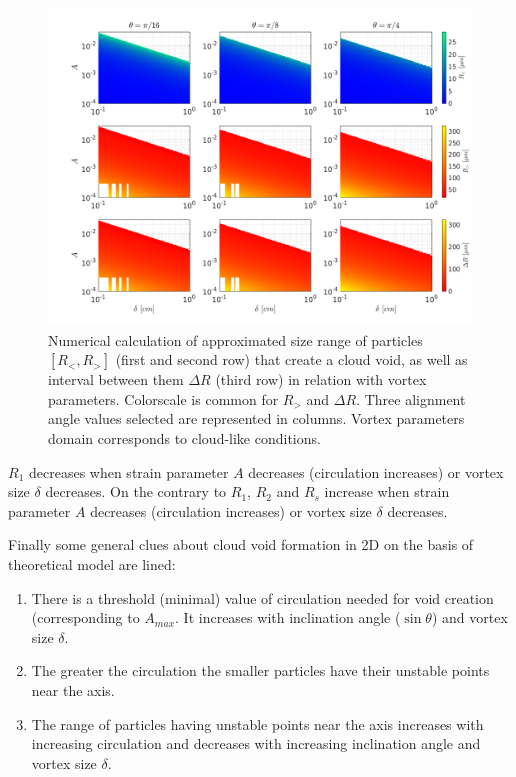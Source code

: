 \documentclass[../main.tex]{subfiles}
\begin{document}
\begin{figure}[h]
\centering
\noindent\includegraphics[width=35pc]{gfx/RlRrDeltaR.png}
\caption{Numerical calculation of approximated size range of particles $[R_<,R_>]$ (first and second row) that create a cloud void, as well as interval between them $\Delta R$ (third row) in relation with vortex parameters. Colorscale is common for $R_>$ and $\Delta R$. Three alignment angle values selected are represented in columns. Vortex parameters domain corresponds to cloud-like conditions.}
\label{fig:ch4_6}
\end{figure}

$R_1$ decreases when strain parameter $A$ decreases (circulation increases) or vortex size $\delta$ decreases. On the contrary to $R_1$, $R_2$ and $R_s$ increase when strain parameter $A$ decreases (circulation increases) or vortex size $\delta$ decreases.

Finally some general clues about cloud void formation in 2D on the basis of theoretical model are lined:
\begin{enumerate}
\item There is a threshold (minimal) value of circulation needed for void creation (corresponding to $A_{max}$. It increases with inclination angle ($\sin \theta$) and vortex size $\delta$.\\
\item The greater the circulation the smaller particles have their unstable points near the axis.
\item The range of particles having unstable points near the axis increases with increasing circulation and decreases with increasing inclination angle and vortex size $\delta$.
\end{enumerate}
\end{document}
